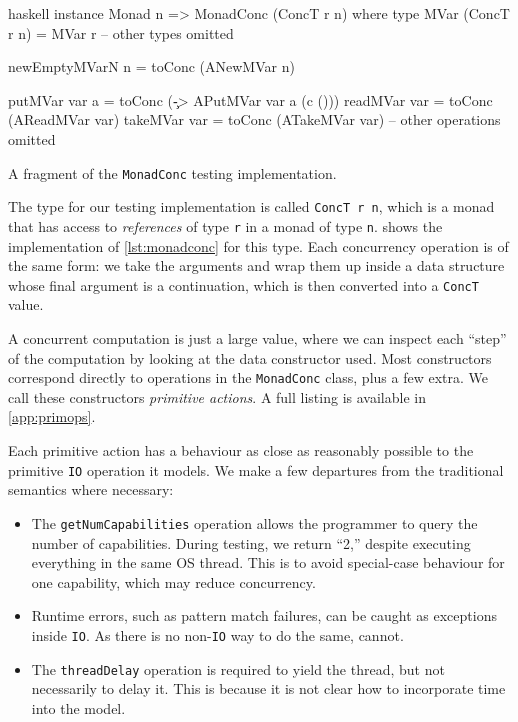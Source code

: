 \begin{listing}
\centering
\begin{cminted}{haskell}
instance Monad n => MonadConc (ConcT r n) where
  type MVar (ConcT r n) = MVar r
  -- other types omitted

  newEmptyMVarN n = toConc (ANewMVar n)

  putMVar  var a = toConc (\c -> APutMVar var a (c ()))
  readMVar var   = toConc (AReadMVar var)
  takeMVar var   = toConc (ATakeMVar var)
  -- other operations omitted
\end{cminted}
\caption{A fragment of the \texttt{MonadConc} testing implementation.}\label{lst:mvarops}
\end{listing}

The type for our testing implementation is called \verb|ConcT r n|, which is a
monad that has access to \emph{references} of type \verb|r| in a monad of type
\verb|n|.   shows the implementation of \cref{lst:monadconc} for
this type.  Each concurrency operation is of the same form: we take the
arguments and wrap them up inside a data structure whose final argument is a
continuation, which is then converted into a \verb|ConcT| value.

A concurrent computation is just a large value, where we can inspect
each ``step'' of the computation by looking at the data constructor
used.  Most constructors correspond directly to operations in the
\verb|MonadConc| class, plus a few extra.  We call these constructors
\emph{primitive actions}.  A full listing is available in
\cref{app:primops}.

Each primitive action has a behaviour as close as reasonably possible
to the primitive \verb|IO| operation it models.  We make a few
departures from the traditional semantics where necessary:

\begin{itemize}
\item The \verb|getNumCapabilities| operation allows the programmer to query the
  number of capabilities.  During testing, we return ``2,'' despite executing
  everything in the same OS thread.  This is to avoid special-case behaviour for
  one capability, which may reduce concurrency.
\item Runtime errors, such as pattern match failures, can be caught as
  exceptions inside \verb|IO|.  As there is no non-\verb|IO| way to do the same,
  \dejafu{} cannot.
\item The \verb|threadDelay| operation is required to yield the thread, but not
  necessarily to delay it.  This is because it is not clear how to incorporate
  time into the model.
\end{itemize}

